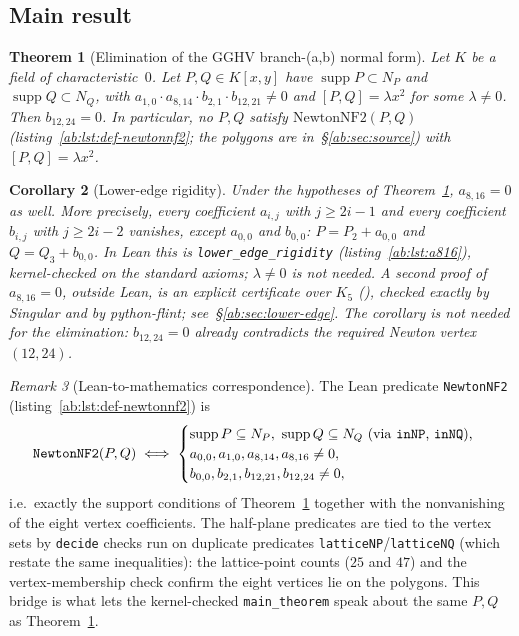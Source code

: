 \documentclass[a4paper,11pt]{article}
\newcommand{\filename}[1]{\texttt{\seqsplit{#1}}}
\theoremstyle{plain}
\newtheorem{theorem}{Theorem}[section]
\newtheorem{corollary}[theorem]{Corollary}
\theoremstyle{definition}
\theoremstyle{remark}
\newtheorem{remark}[theorem]{Remark}
\begin{document}
\subsection{Main result}

\begin{theorem}[Elimination of the GGHV branch-(a,b) normal form]\label{ab:thm:main}
Let $K$ be a field of characteristic~$0$. Let $P,Q\in K[x,y]$ have
$\operatorname{supp}P\subset N_P$ and $\operatorname{supp}Q\subset N_Q$,
with $a_{1,0}\cdot a_{8,14}\cdot b_{2,1}\cdot b_{12,21}\neq0$ and
$[P,Q]=\lambda x^2$ for some $\lambda\neq0$. Then $b_{12,24}=0$.
In particular, no $P,Q$ satisfy $\mathrm{NewtonNF2}(P,Q)$
(listing~\ref{ab:lst:def-newtonnf2}; the polygons are in~\S\ref{ab:sec:source})
with $[P,Q]=\lambda x^2$.
\end{theorem}

\begin{corollary}[Lower-edge rigidity]\label{ab:cor:a816}
Under the hypotheses of Theorem~\ref{ab:thm:main}, $a_{8,16}=0$ as well. More precisely, every coefficient
$a_{i,j}$ with $j\geq 2i-1$ and every coefficient $b_{i,j}$ with $j\geq 2i-2$ vanishes, except $a_{0,0}$ and $b_{0,0}$:
$P=P_2+a_{0,0}$ and $Q=Q_3+b_{0,0}$.
In Lean this is \texttt{lower\_edge\_rigidity} (listing~\ref{ab:lst:a816}), kernel-checked on the standard axioms;
$\lambda\neq0$ is not needed. A second proof of $a_{8,16}=0$, outside Lean, is an explicit certificate over $K_5$
(\filename{scripts/a816\_certificate/}), checked exactly by {\sc Singular} and by python-flint;
see~\S\ref{ab:sec:lower-edge}. The corollary is not needed for the elimination: $b_{12,24}=0$
already contradicts the required Newton vertex $(12,24)$.
\end{corollary}

\begin{remark}[Lean-to-mathematics correspondence]\label{ab:rem:nf2-bridge}
The Lean predicate \texttt{NewtonNF2} (listing~\ref{ab:lst:def-newtonnf2}) is
\[
\texttt{NewtonNF2}(P,Q)\iff
\begin{cases}
\operatorname{supp}P\subseteq N_P,\ \operatorname{supp}Q\subseteq N_Q
\text{ (via \texttt{inNP}, \texttt{inNQ}),}\\
a_{0,0},a_{1,0},a_{8,14},a_{8,16}\neq0,\\
b_{0,0},b_{2,1},b_{12,21},b_{12,24}\neq0,
\end{cases}
\]
i.e.\ exactly the support conditions of Theorem~\ref{ab:thm:main} together with the nonvanishing of the eight vertex coefficients. The half-plane predicates are tied to the vertex sets by \texttt{decide} checks run on duplicate predicates \texttt{latticeNP}/\texttt{latticeNQ} (which restate the same inequalities): the lattice-point counts ($25$ and $47$) and the vertex-membership check confirm the eight vertices lie on the polygons. This bridge is what lets the kernel-checked \texttt{main\_theorem} speak about the same $P,Q$ as Theorem~\ref{ab:thm:main}.
\end{remark}
\end{document}
